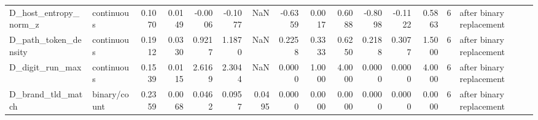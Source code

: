 \begin{tabular}{llrrrrrrrrrrrrl}
D\_host\_entropy\_norm\_z & continuous & 0.1070 & 0.0149 & -0.0006 & -0.1077 & NaN & -0.6359 & 0.0017 & 0.6088 & -0.8098 & -0.1122 & 0.5863 & 6 & after binary replacement \\
D\_path\_token\_density & continuous & 0.1912 & 0.0330 & 0.9217 & 1.1870 & NaN & 0.2258 & 0.3333 & 0.6250 & 0.2188 & 0.3077 & 1.5000 & 6 & after binary replacement \\
D\_digit\_run\_max & continuous & 0.1539 & 0.0115 & 2.6169 & 2.3044 & NaN & 0.0000 & 1.0000 & 4.0000 & 0.0000 & 0.0000 & 4.0000 & 6 & after binary replacement \\
D\_brand\_tld\_match & binary/count & 0.2359 & 0.0068 & 0.0462 & 0.0957 & 0.0495 & 0.0000 & 0.0000 & 0.0000 & 0.0000 & 0.0000 & 0.0000 & 6 & after binary replacement \\
\bottomrule
\end{tabular}
